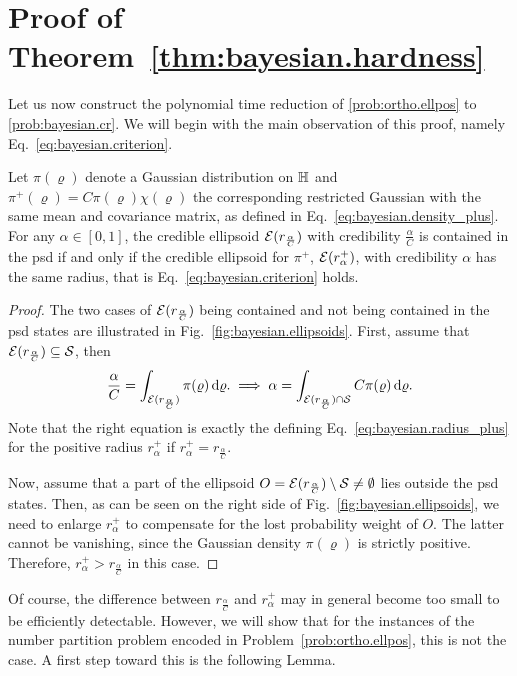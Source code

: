 \section{Proof of Theorem~\ref{thm:bayesian.hardness}}
\label{sec:error.proof_bayesian}

Let us now construct the polynomial time reduction of \cref{prob:ortho.ellpos} to \cref{prob:bayesian.cr}.
We will begin with the main observation of this proof, namely Eq.~\eqref{eq:bayesian.criterion}.
\begin{lemma}\label{lem:bayesian.criterion}
  Let $\pi(\varrho)$ denote a Gaussian distribution on $\mathbb{H}$ and $\pi^+(\varrho) = C \pi(\varrho) \chi(\varrho)$ the corresponding restricted Gaussian with the same mean and covariance matrix, as defined in Eq.~\eqref{eq:bayesian.density_plus}.
  For any $\alpha \in [0,1]$, the credible ellipsoid $\mathcal{E}(r_\frac{\alpha}{C})$ with credibility $\frac{\alpha}{C}$ is contained in the psd if and only if the credible ellipsoid for $\pi^+$, $\mathcal{E}(r^+_{\alpha})$, with credibility $\alpha$ has the same radius, that is Eq.~\eqref{eq:bayesian.criterion} holds.
\end{lemma}
\begin{proof}
  The two cases of  $\mathcal{E}(r_\frac{\alpha}{C})$ being contained and not being contained in the psd states are illustrated in Fig.~\ref{fig:bayesian.ellipsoids}.
  First, assume that $\mathcal{E}(r_\frac{\alpha}{C}) \subseteq \mathcal{S}$, then
  \[
    \frac{\alpha}{C} = \int_{\mathcal{E}(r_\frac{\alpha}{C})} \pi(\varrho) \, \mathrm{d} \varrho.
    \implies
    \alpha = \int_{\mathcal{E}(r_\frac{\alpha}{C}) \cap \mathcal{S} } C \pi(\varrho) \, \mathrm{d} \varrho.
  \]
  Note that the right equation is exactly the defining Eq.~\eqref{eq:bayesian.radius_plus} for the positive radius $r^+_{\alpha}$ if $r^+_\alpha = r_\frac{\alpha}{C}$.

  Now, assume that a part of the ellipsoid $O = \mathcal{E}(r_\frac{\alpha}{C})  \setminus \mathcal{S} \neq \emptyset$ lies outside the psd states.
  Then, as can be seen on the right side of Fig.~\ref{fig:bayesian.ellipsoids}, we need to enlarge $r^+_{\alpha}$ to compensate for the lost probability weight of $O$.
  The latter cannot be vanishing, since the Gaussian density $\pi(\varrho)$ is strictly positive.
  Therefore, $r^+_\alpha > r_\frac{\alpha}{C}$ in this case.
\end{proof}
Of course, the difference between $r_\frac{\alpha}{C}$ and $r^+_{\alpha}$ may in general become too small to be efficiently detectable.
However, we will show that for the instances of the number partition problem encoded in Problem~\ref{prob:ortho.ellpos}, this is not the case.
A first step toward this is the following Lemma.

